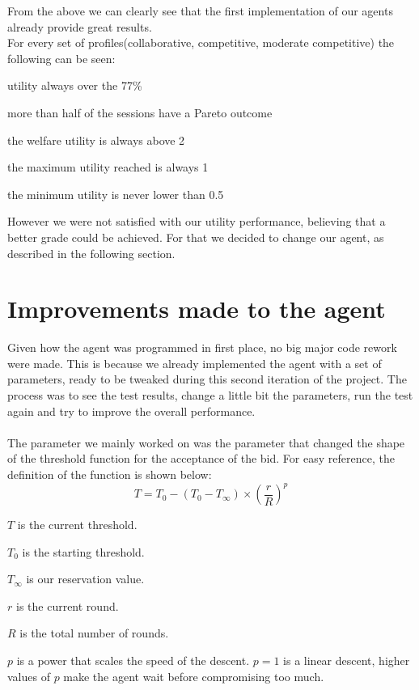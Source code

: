 \documentclass[a4,11pt]{scrartcl}
\let\tempone\itemize
\let\temptwo\enditemize
\renewenvironment{itemize}{\tempone\addtolength{\itemsep}{-0.5\baselineskip}}{\temptwo}
\begin{document}
From the above we can clearly see that the first implementation of our agents already provide great results. 
\\ 
For every set of profiles(collaborative, competitive, moderate competitive) the following can be seen:
  \begin{itemize} 
  \item utility always over the 77\%
  \item more than half of the sessions have a Pareto outcome
  \item the welfare utility is always above 2
  \item the maximum utility reached is always 1
  \item the minimum utility is never lower than 0.5
  \end{itemize}

However we were not satisfied with our utility performance, believing that a better grade could be achieved. For that we decided to change our agent, as described in the following section.  
\label{sec:testresults}



\section{Improvements made to the agent}
Given how the agent was programmed in first place, no big major code rework were made. This is because we already implemented the agent with a set of parameters, ready to be tweaked during this second iteration of the project. The process was to see the test results, change a little bit the parameters, run the test again and try to improve the overall performance.
\\ \\
The parameter we mainly worked on was the parameter that changed the shape of the threshold function for the acceptance of the bid. For easy reference, the definition of the function is shown below:
\\
\begin{equation}
    T=T_{0}-(T_{0}-T_{\infty})\times\left(\frac{r}{R}\right)^{p}
\end{equation}
\begin{itemize}
    \item $T$ is the current threshold.
    \item $T_{0}$ is the starting threshold.
    \item $T_{\infty}$ is our reservation value.
    \item $r$ is the current round.
    \item $R$ is the total number of rounds.
    \item $p$ is a power that scales the speed of the descent. $p=1$ is
    a linear descent, higher values of $p$ make the agent wait before
    compromising too much.
\end{itemize}
\end{document}

